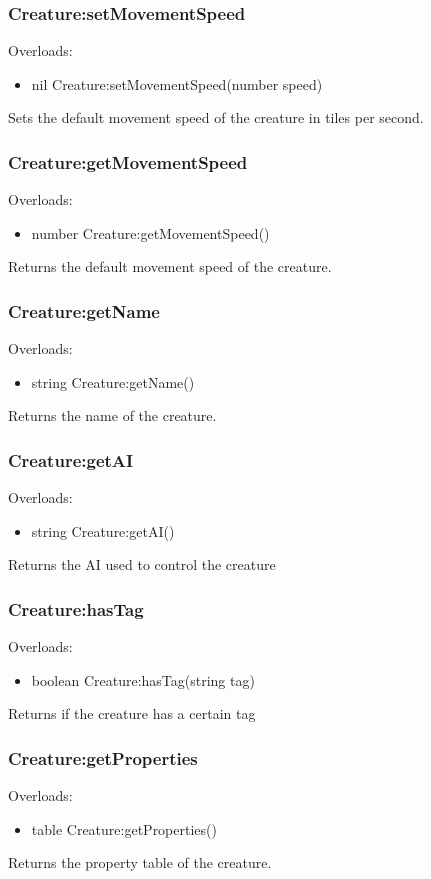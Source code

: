 \documentclass{book}
\newenvironment{ulist}
	{\begin{itemize}
			\itemsep0em}
	{\end{itemize}}
\begin{document}
\subsubsection{Creature:setMovementSpeed}
Overloads:
\begin{ulist}
	\item nil Creature:setMovementSpeed(number speed)
\end{ulist}
Sets the default movement speed of the creature in tiles per second.

\subsubsection{Creature:getMovementSpeed}
Overloads:
\begin{ulist}
	\item number Creature:getMovementSpeed()
\end{ulist}
Returns the default movement speed of the creature.

\subsubsection{Creature:getName}
Overloads:
\begin{ulist}
	\item string Creature:getName()
\end{ulist}
Returns the name of the creature.

\subsubsection{Creature:getAI}
Overloads:
\begin{ulist}
	\item string Creature:getAI()
\end{ulist}
Returns the AI used to control the creature

\subsubsection{Creature:hasTag}
Overloads:
\begin{ulist}
	\item boolean Creature:hasTag(string tag)
\end{ulist}
Returns if the creature has a certain tag

\subsubsection{Creature:getProperties}
Overloads:
\begin{ulist}
	\item table Creature:getProperties()
\end{ulist}
Returns the property table of the creature.
\end{document}
